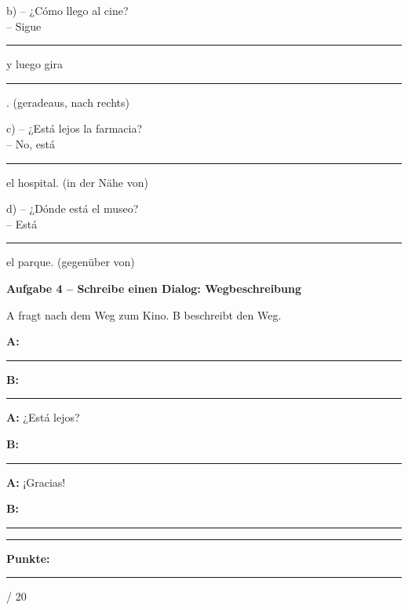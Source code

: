 \documentclass[11pt, a4paper]{article}
\newcommand{\fachfarbe}{spanisch}
\newcommand{\maxpunkte}{20}
\newcommand{\punktebox}[1]{\hfill\fbox{\small \_/#1}}
\newcommand{\luecke}[1]{\rule{#1}{0.4pt}}
\newenvironment{aufgabe}[1]{%
    \needspace{5\baselineskip}%
    \nopagebreak[4]%
    \vspace{10pt}
    \noindent\textbf{\textcolor{\fachfarbe}{Aufgabe #1}}
    \nopagebreak[4]%
    \vspace{5pt}
    \nopagebreak[4]%
    \begin{list}{}{\leftmargin=0pt}
    \item[]
}{%
    \end{list}
}
\begin{document}
\vspace{0.8em}

\noindent
b) -- ¿Cómo llego al cine?\\
\hspace*{0.5cm} -- Sigue \luecke{4cm} y luego gira \luecke{4cm}. (geradeaus, nach rechts)

\vspace{0.8em}

\noindent
c) -- ¿Está lejos la farmacia?\\
\hspace*{0.5cm} -- No, está \luecke{4cm} el hospital. (in der Nähe von)

\vspace{0.8em}

\noindent
d) -- ¿Dónde está el museo?\\
\hspace*{0.5cm} -- Está \luecke{4cm} el parque. (gegenüber von)

\vspace{10pt}


\begin{aufgabe}{4 -- Schreibe einen Dialog: Wegbeschreibung}
A fragt nach dem Weg zum Kino. B beschreibt den Weg. \punktebox{6}
\end{aufgabe}

\noindent
\textbf{A:} \luecke{10cm}

\vspace{0.8em}

\noindent
\textbf{B:} \luecke{10cm}

\vspace{0.8em}

\noindent
\textbf{A:} ¿Está lejos?

\vspace{0.8em}

\noindent
\textbf{B:} \luecke{10cm}

\vspace{0.8em}

\noindent
\textbf{A:} ¡Gracias!

\vspace{0.8em}

\noindent
\textbf{B:} \luecke{6cm}


\vspace{20pt}
\hrule
\vspace{10pt}

\begin{flushright}
\textbf{Punkte:} \luecke{1cm} / \maxpunkte
\end{flushright}
\end{document}
